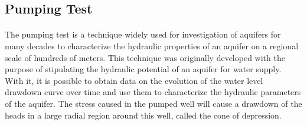 \documentclass[11pt, a4paper]{article}
\begin{document}
    \subsection{Pumping Test}
    \paragraph{} %
    The pumping test is a technique widely used for investigation of aquifers for many decades to characterize the hydraulic properties of an aquifer on a regional scale of hundreds of meters. This technique was originally developed with the purpose of stipulating the hydraulic potential of an aquifer for water supply. With it, it is possible to obtain data on the evolution of the water level drawdown curve over time and use them to characterize the hydraulic parameters of the aquifer. The stress caused in the pumped well will cause a drawdown of the heads in a large radial region around this well, called the cone of depression.
\end{document}
